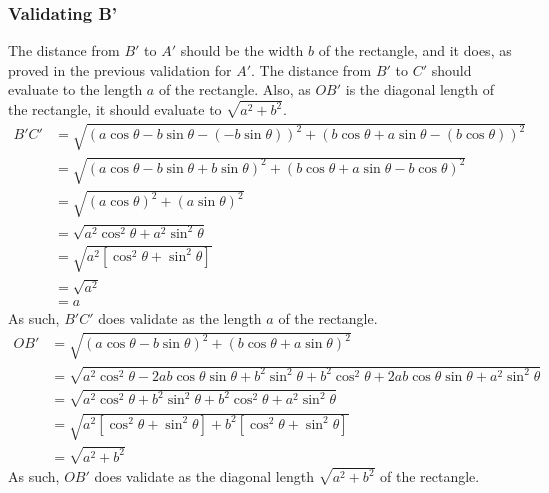 \documentclass{article}
\begin{document}
        \subsubsection{Validating B'} The distance from $B'$ to $A'$ should be the width $b$ of the rectangle, and it does, as proved in the previous validation for $A'$. The distance from $B'$ to $C'$ should evaluate to the length $a$ of the rectangle. Also, as $OB'$ is the diagonal length of the rectangle, it should evaluate to $\sqrt{a^2 + b^2}$.
        \begin{align*}
        	B'C' &= \sqrt{(a\cos{\theta} -b\sin{\theta} - (-b\sin{\theta}))^2 + (b\cos{\theta} + a\sin{\theta} - (b\cos{\theta}))^2} \\
        	&= \sqrt{(a\cos{\theta} -b\sin{\theta} + b\sin{\theta})^2 + (b\cos{\theta} + a\sin{\theta} - b\cos{\theta})^2} \\
        	&= \sqrt{(a\cos{\theta})^2 + (a\sin{\theta})^2} \\
        	&= \sqrt{a^2\cos^2{\theta} + a^2\sin^2{\theta}} \\
        	&= \sqrt{a^2[\cos^2{\theta} + \sin^2{\theta}]} \\
        	&= \sqrt{a^2} \\
        	&= a
        \end{align*}
        As such, $B'C'$ does validate as the length $a$ of the rectangle.
        \begin{align*}
        	OB' &= \sqrt{(a\cos{\theta} -b\sin{\theta})^2 + (b\cos{\theta} + a\sin{\theta})^2} \\
        	&= \sqrt{a^2\cos^2{\theta} - 2ab\cos\theta\sin\theta + b^2\sin^2{\theta} + b^2\cos^2{\theta} + 2ab\cos\theta\sin\theta + a^2\sin^2{\theta}} \\
        	&= \sqrt{a^2\cos^2{\theta} + b^2\sin^2{\theta} + b^2\cos^2{\theta} + a^2\sin^2{\theta}} \\
        	&= \sqrt{a^2[\cos^2{\theta} + \sin^2{\theta}] + b^2[\cos^2{\theta} + \sin^2{\theta}]} \\
        	&= \sqrt{a^2 + b^2}
        \end{align*}
        As such, $OB'$ does validate as the diagonal length $\sqrt{a^2 + b^2}$ of the rectangle.
\end{document}
